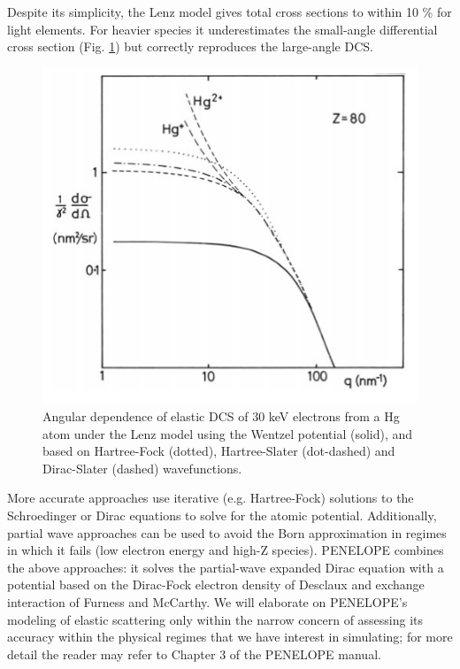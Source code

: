 \documentclass [11pt, proquest, article] {uwthesis}[2016/11/22]
\begin{document}
Despite its simplicity, the Lenz model gives total cross sections to within 10 \% for light elements.\cite{geiger1964streuung} For heavier species it underestimates the small-angle differential cross section (Fig. \ref{fig:e3.3}) but correctly reproduces the large-angle DCS.

\begin{figure}[h] 
	\caption{Angular dependence of elastic DCS of 30 keV electrons from a Hg atom under the Lenz model using the Wentzel potential (solid), and based on Hartree-Fock (dotted), Hartree-Slater (dot-dashed) and Dirac-Slater (dashed) wavefunctions.  \cite{egerton2011electron} }
	\label{fig:e3.3}
\centering
\includegraphics[scale=0.5]{../Figures/egerton_3_3.png}
\end{figure}

More accurate approaches use iterative (e.g. Hartree-Fock) solutions to the Schroedinger or Dirac equations to solve for the atomic potential.\cite{rez1984elastic} Additionally, partial wave approaches can be used to avoid the Born approximation in regimes in which it fails (low electron energy and high-Z species). PENELOPE combines the above approaches: it solves the partial-wave expanded Dirac equation with a potential based on the Dirac-Fock electron density of Desclaux and exchange interaction of Furness and McCarthy. \cite{desclaux1975multiconfiguration, furness1973semiphenomenological} We will elaborate on PENELOPE's modeling of elastic scattering only within the narrow concern of assessing its accuracy within the physical regimes that we have interest in simulating; for more detail the reader may refer to Chapter 3 of the PENELOPE manual. 
\end{document}
